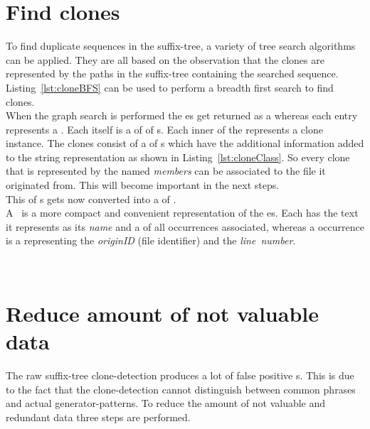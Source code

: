 \section{Find clones}
\label{section:findClones}
To find duplicate sequences in the suffix-tree, a variety of tree search algorithms can be applied. They are all based on the observation that the clones are represented by the paths in the suffix-tree containing the searched sequence. Listing~\ref{lst:cloneBFS} can be used to perform a breadth first search to find clones.\\
When the graph search is performed the es get returned as a  whereas each entry represents a . Each  itself is a  of  of s. Each inner  of the  represents a clone instance. The clones consist of a  of s which have the additional information added to the string representation as shown in Listing~\ref{lst:cloneClass}. So every clone that is represented by the  named \textit{members} can be associated to the file it originated from. This will become important in the next steps.\\
This  of s gets now converted into a  of . \\
A~ is a more compact and convenient representation of the es. Each has the text it represents as its \textit{name} and a  of all occurrences associated, whereas a occurrence is a  representing the \textit{originID} (file identifier) and the \textit{line~number}.\\

\quad\\


\section{Reduce amount of not valuable data}
\label{section:processCloneResults}
The raw suffix-tree clone-detection produces a lot of false positive s. This is due to the fact that the clone-detection cannot distinguish between common phrases and actual generator-patterns. To reduce the amount of not valuable and redundant data three steps are performed.
